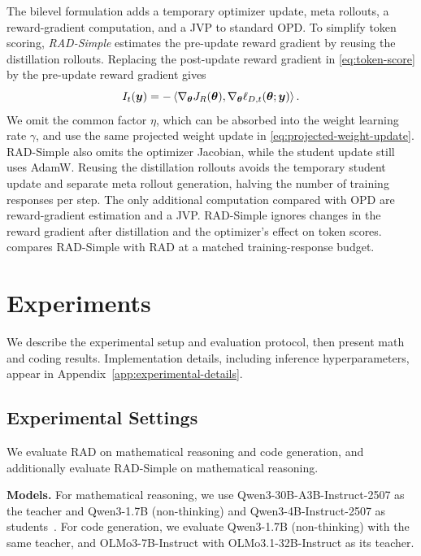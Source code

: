 \documentclass{article} %
\begin{document}
The bilevel formulation adds a temporary
optimizer update, meta rollouts, a reward-gradient computation, and a JVP
to standard OPD. To simplify token scoring,
\emph{RAD-Simple} estimates the pre-update reward gradient
by reusing the distillation rollouts.
Replacing the post-update reward gradient in \cref{eq:token-score} by
the pre-update reward gradient gives
\begin{equation*}
    I_t(\bm{y})
    =- \left\langle
        \nabla_{\bm{\theta}}J_R(\bm{\theta}),
        \nabla_{\bm{\theta}}\ell_{D,t}(\bm{\theta};\bm{y})
    \right\rangle.
\end{equation*}
We omit the common factor \(\eta\), which can be absorbed into
the weight learning rate \(\gamma\), and use the same projected
weight update in \cref{eq:projected-weight-update}.
RAD-Simple also omits the
optimizer Jacobian, while the student update still uses AdamW.
Reusing the distillation rollouts avoids the temporary student update and
separate meta rollout generation, halving the number of training responses per step.
The only additional computation compared with OPD are
reward-gradient estimation and a JVP. RAD-Simple
ignores changes in the reward gradient after distillation and the
optimizer's effect on token scores.  compares
RAD-Simple with RAD at a matched training-response budget.



\section{Experiments}
\label{sec:experiments}

We describe the experimental setup and evaluation protocol, then present math and coding results. Implementation details, including inference hyperparameters, appear in Appendix~\ref{app:experimental-details}.

\subsection{Experimental Settings}
\label{sec:experimental-settings}

We evaluate RAD on mathematical reasoning and code generation, and additionally evaluate RAD-Simple on mathematical reasoning.

\noindent\textbf{Models.}\enspace
For mathematical reasoning, we use Qwen3-30B-A3B-Instruct-2507 as the teacher and Qwen3-1.7B (non-thinking) and Qwen3-4B-Instruct-2507 as students~\citep{yang2025qwen3}. For code generation, we evaluate Qwen3-1.7B (non-thinking) with the same teacher, and OLMo3-7B-Instruct with OLMo3.1-32B-Instruct as its teacher.
\end{document}
